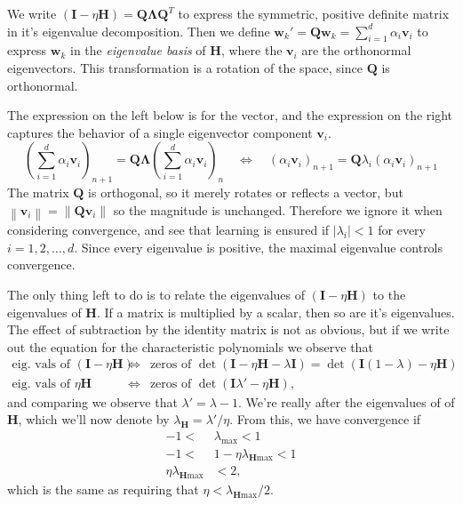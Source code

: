 \documentclass[12pt, a4paper]{article}
\newcommand{\vect}[1]{\bm{#1}}
\newcommand{\norm}[1]{\left\lVert#1\right\rVert}
\newcommand{\abs}[1]{\left\lvert#1\right\rvert}
\begin{document}
{\begin{easylist}[enumerate]
We write $\left( \vect{I} - \eta  \vect{H} \right) = \vect{Q} \vect{\Lambda} \vect{Q}^T$ to express the symmetric, positive definite matrix in it's eigenvalue decomposition.
Then we define $\vect{w}_{k}' = \vect{Q} \vect{w}_{k} = \sum_{i=1}^{d} \alpha_i \vect{v}_i$ to express $\vect{w}_{k}$ in the \emph{eigenvalue basis} of $\vect{H}$, where the $\vect{v}_i$ are the orthonormal eigenvectors. 
This transformation is a rotation of the space, since $\vect{Q}$ is orthonormal.

The expression on the left below is for the vector, and the expression on the right captures the behavior of a single eigenvector component $\vect{v}_i$.
\begin{equation*}
	\left(\sum_{i=1}^{d} \alpha_i \vect{v}_i\right)_{n+1} = \vect{Q} \vect{\Lambda} \left(\sum_{i=1}^{d} \alpha_i \vect{v}_i\right)_{n}
	\quad \Leftrightarrow \quad
	(\alpha_i \vect{v}_i)_{n+1} = \vect{Q} \lambda_i (\alpha_i \vect{v}_i)_{n+1}
\end{equation*}
The matrix $\vect{Q}$ is orthogonal, so it merely rotates or reflects a vector, but $\norm{\vect{v}_i} = \norm{\vect{Q} \vect{v}_i}$ so the magnitude is unchanged.
Therefore we ignore it when considering convergence, and see that learning is ensured if $\abs{\lambda_i} < 1$ for every $i=1, 2, \dots, d$.
Since every eigenvalue is positive, the maximal eigenvalue controls convergence.

The only thing left to do is to relate the eigenvalues of $\left( \vect{I} - \eta  \vect{H} \right)$ to the eigenvalues of $ \vect{H}$.
If a matrix is multiplied by a scalar, then so are it's eigenvalues.
The effect of subtraction by the identity matrix is not as obvious, but if we write out the equation for the characteristic polynomials we observe that
\begin{align*}
	\text{eig. vals of } \left( \vect{I} - \eta  \vect{H} \right) \, &\Leftrightarrow \, \text{ zeros of } \det \left(  \vect{I} -  \eta  \vect{H} - \lambda \vect{I} \right)
	=
	\det \left(  \vect{I} (1 - \lambda ) - \eta  \vect{H} \right)
	 \\
	\text{eig. vals of } \eta  \vect{H} \, &\Leftrightarrow \, \text{ zeros of } \det \left(  \vect{I} \lambda'  - \eta   \vect{H} \right),
\end{align*}
and comparing we observe that $\lambda' = \lambda - 1$.
We're really after the eigenvalues of  of $\vect{H}$, which we'll now denote by $\lambda_{\vect{H}} = \lambda' / \eta$.
From this, we have convergence if
\begin{align*}
	-1 < &\lambda_{\text{max}} < 1 \\
	-1 < &1 - \eta \lambda_{\vect{H} \text{max}} < 1 \\
	\eta \lambda_{\vect{H} \text{max}} &< 2,
\end{align*}
which is the same as requiring that $\eta < \lambda_{\vect{H} \text{max}} / 2$.


\end{easylist}}
\end{document}
